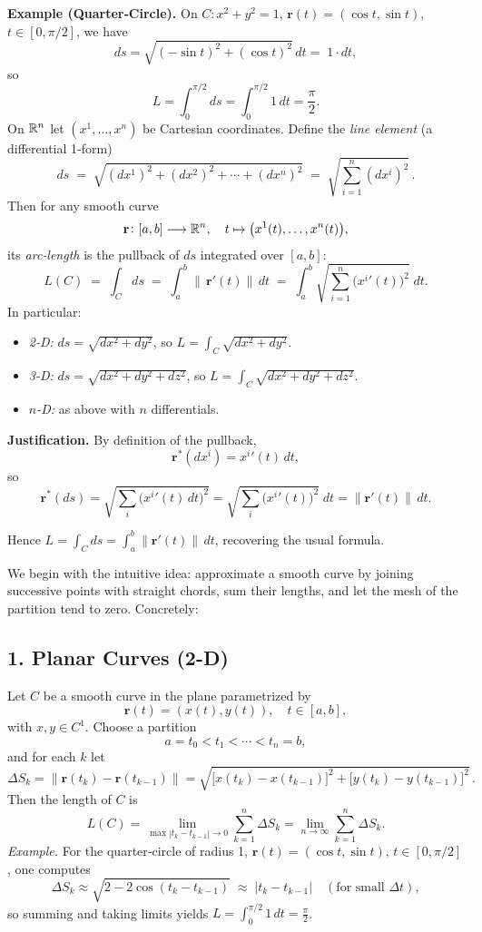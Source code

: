 \documentclass[11pt,openany]{article}
\begin{document}
\noindent\textbf{Example (Quarter‐Circle).}  On $C\!:x^2+y^2=1$, 
$\mathbf r(t)=(\cos t,\sin t)$, $t\in[0,\pi/2]$, we have
\[
ds
=\sqrt{(-\sin t)^2+(\cos t)^2}\,dt
=\;1\cdot dt,
\]
so
\[
L
=\int_0^{\pi/2}ds
=\int_0^{\pi/2}1\,dt
=\frac\pi2.
\]
\newpage
On \(\mathbb{R}^n\) let \((x^1,\dots,x^n)\) be Cartesian coordinates.  Define the \emph{line element} (a differential 1-form)
\[
\boxed{
	ds \;=\;\sqrt{(dx^1)^2+(dx^2)^2+\cdots+(dx^n)^2}
	\;=\;\sqrt{\sum_{i=1}^n(dx^i)^2}\,.
}
\]
Then for any smooth curve
\[
\mathbf r\colon [a,b]\longrightarrow\mathbb{R}^n,
\quad
t\mapsto \bigl(x^1(t),\dots,x^n(t)\bigr),
\]
its \emph{arc‐length} is the pullback of \(ds\) integrated over \([a,b]\):
\[
\boxed{
	L(C)
	\;=\;
	\int_C ds
	\;=\;
	\int_a^b \bigl\|\,\mathbf r'(t)\bigr\|\,dt
	\;=\;
	\int_a^b \sqrt{\sum_{i=1}^n \bigl(x^i{}'(t)\bigr)^2}\;dt.
}
\]
In particular:
\begin{itemize}
	\item \emph{2-D:} \(ds=\sqrt{dx^2+dy^2}\), so 
	\(\displaystyle L=\int_C\sqrt{dx^2+dy^2}\).
	\item \emph{3-D:} \(ds=\sqrt{dx^2+dy^2+dz^2}\), so 
	\(\displaystyle L=\int_C\sqrt{dx^2+dy^2+dz^2}\).
	\item \emph{\(n\)-D:} as above with \(n\) differentials.
\end{itemize}

\bigskip

\noindent\textbf{Justification.}  By definition of the pullback,
\[
\mathbf r^*(dx^i)=x^i{}'(t)\,dt,
\]
so
\[
\mathbf r^*(ds)
=\sqrt{\sum_i\bigl(x^i{}'(t)\,dt\bigr)^2}
=\sqrt{\sum_i\bigl(x^i{}'(t)\bigr)^2}\;dt
=\|\mathbf r'(t)\|\,dt.
\]

\noindent Hence 
\(\displaystyle L=\int_C ds=\int_a^b\|\mathbf r'(t)\|\,dt\), 
recovering the usual formula.  


\newpage

We begin with the intuitive idea: approximate a smooth curve by joining successive points with straight chords, sum their lengths, and let the mesh of the partition tend to zero.  Concretely:

\bigskip

\subsection*{1. Planar Curves (2-D)}

Let \(C\) be a smooth curve in the plane parametrized by 
\[
\mathbf r(t)=(x(t),y(t)),\quad t\in[a,b],
\]
with \(x,y\in C^1\).  Choose a partition
\[
a=t_0<t_1<\cdots<t_n=b,
\]
and for each \(k\) let
\[
\Delta S_k
=\bigl\|\mathbf r(t_k)-\mathbf r(t_{k-1})\bigr\|
=\sqrt{\bigl[x(t_k)-x(t_{k-1})\bigr]^2
	+\bigl[y(t_k)-y(t_{k-1})\bigr]^2}\,.
\]
Then the length of \(C\) is
\[
L(C)
=\lim_{\max|t_k-t_{k-1}|\to0}
\sum_{k=1}^n\Delta S_k
=\lim_{n\to\infty}\sum_{k=1}^n\Delta S_k.
\]
\emph{Example.}  For the quarter‐circle of radius 1,
\(\mathbf r(t)=(\cos t,\sin t)\), \(t\in[0,\pi/2]\), one computes
\[
\Delta S_k
\approx\sqrt{2-2\cos(t_k-t_{k-1})}
\;\approx\;|t_k-t_{k-1}|
\quad(\text{for small }\Delta t),
\]
so summing and taking limits yields
\(\displaystyle L=\int_0^{\pi/2}1\,dt=\frac\pi2\).
\end{document}
